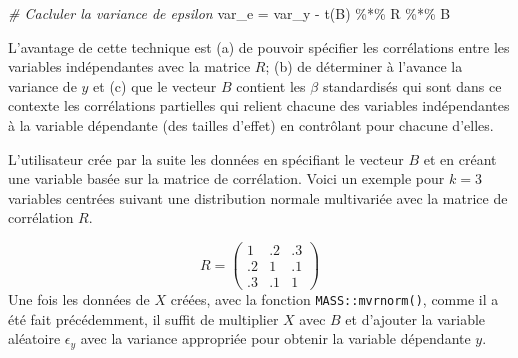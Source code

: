 \documentclass[
]{book}
\newenvironment{Shaded}{}{}
\newcommand{\CommentTok}[1]{\textit{#1}}
\newcommand{\FunctionTok}[1]{#1}
\newcommand{\NormalTok}[1]{#1}
\newcommand{\OtherTok}[1]{#1}
\newcommand{\SpecialCharTok}[1]{#1}
\begin{document}
\begin{Shaded}
\begin{Highlighting}[]
\CommentTok{\# Cacluler la variance de epsilon}
\NormalTok{var\_e }\OtherTok{=}\NormalTok{ var\_y }\SpecialCharTok{{-}} \FunctionTok{t}\NormalTok{(B) }\SpecialCharTok{\%*\%}\NormalTok{ R }\SpecialCharTok{\%*\%}\NormalTok{ B}
\end{Highlighting}
\end{Shaded}

L'avantage de cette technique est (a) de pouvoir spécifier les corrélations entre les variables indépendantes avec la matrice \(R\); (b) de déterminer à l'avance la variance de \(y\) et (c) que le vecteur \(B\) contient les \(\beta\) standardisés qui sont dans ce contexte les corrélations partielles qui relient chacune des variables indépendantes à la variable dépendante (des tailles d'effet) en contrôlant pour chacune d'elles.

L'utilisateur crée par la suite les données en spécifiant le vecteur \(B\) et en créant une variable basée sur la matrice de corrélation. Voici un exemple pour \(k=3\) variables centrées suivant une distribution normale multivariée avec la matrice de corrélation \(R\).

\[
R= \left( 
\begin{array}{ccc}
1 & .2 & .3\\
.2 & 1 & .1\\
.3 & .1 & 1
\end{array}
\right)
\]
Une fois les données de \(X\) créées, avec la fonction \texttt{MASS::mvrnorm()}, comme il a été fait précédemment, il suffit de multiplier \(X\) avec \(B\) et d'ajouter la variable aléatoire \(\epsilon_y\) avec la variance appropriée pour obtenir la variable dépendante \(y\).
\end{document}

